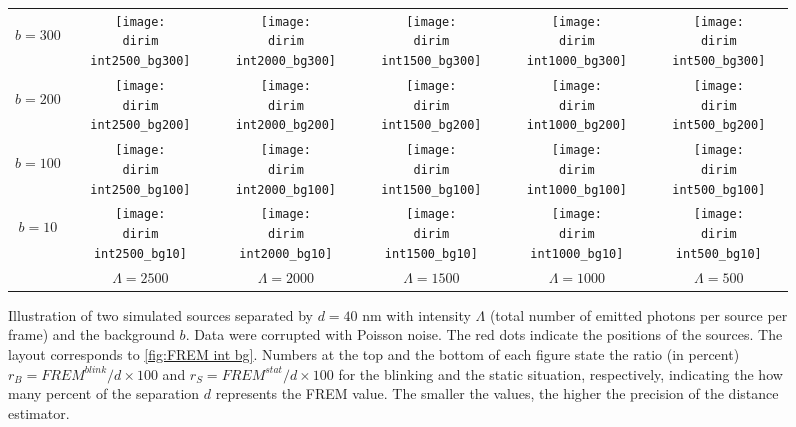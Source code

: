 \begin{figure}[!hbt]
	\centering
	\newcommand{\wf}{.14\textwidth}
	\newcommand{\dirim}{\qd gFREM/images/psf2/text_twosources_}
	\newcommand{\vs}{.4}
	\begin{tabular}{c|ccccc}
		\begin{sideways}\hspace{\vs cm}$b=300$\end{sideways}
		&\texttt{[image: \\dirim int2500\_bg300]}
		&\texttt{[image: \\dirim int2000\_bg300]}
		&\texttt{[image: \\dirim int1500\_bg300]}
		&\texttt{[image: \\dirim int1000\_bg300]}
		&\texttt{[image: \\dirim int500\_bg300]}\\
		\begin{sideways}\hspace{\vs cm}$b=200$\end{sideways}
		&\texttt{[image: \\dirim int2500\_bg200]}
		&\texttt{[image: \\dirim int2000\_bg200]}
		&\texttt{[image: \\dirim int1500\_bg200]}
		&\texttt{[image: \\dirim int1000\_bg200]}
		&\texttt{[image: \\dirim int500\_bg200]}\\
		\begin{sideways}\hspace{\vs cm}$b=100$\end{sideways}
		&\texttt{[image: \\dirim int2500\_bg100]}
		&\texttt{[image: \\dirim int2000\_bg100]}
		&\texttt{[image: \\dirim int1500\_bg100]}
		&\texttt{[image: \\dirim int1000\_bg100]}
		&\texttt{[image: \\dirim int500\_bg100]}\\
		\begin{sideways}\hspace{\vs cm}$b=10$\end{sideways}
		&\texttt{[image: \\dirim int2500\_bg10]}
		&\texttt{[image: \\dirim int2000\_bg10]}
		&\texttt{[image: \\dirim int1500\_bg10]}
		&\texttt{[image: \\dirim int1000\_bg10]}
		&\texttt{[image: \\dirim int500\_bg10]}\\
		\hline	
		&$\Lambda=2500$ & $\Lambda=2000$ & $\Lambda=1500$ & $\Lambda=1000$ & $\Lambda=500$\\
	\end{tabular}
	\caption{Illustration of two simulated sources separated by $d=40$ nm with intensity $\Lambda$ (total number of emitted photons per source per frame) and the background $b$. Data were corrupted with Poisson noise. The red dots indicate the positions of the sources. The layout corresponds to \autoref{fig:FREM int bg}. Numbers at the top and the bottom of each figure state the ratio (in percent) $r_B=\unit{FREM}^{blink}/d\times100$ and $r_S=\unit{FREM}^{stat}/d\times100$ for the blinking and the static situation, respectively, indicating the how many percent of the separation $d$ represents the FREM value. The smaller the values, the higher the precision of the distance estimator.}
	\label{fig:two sources int bg}
\end{figure}
